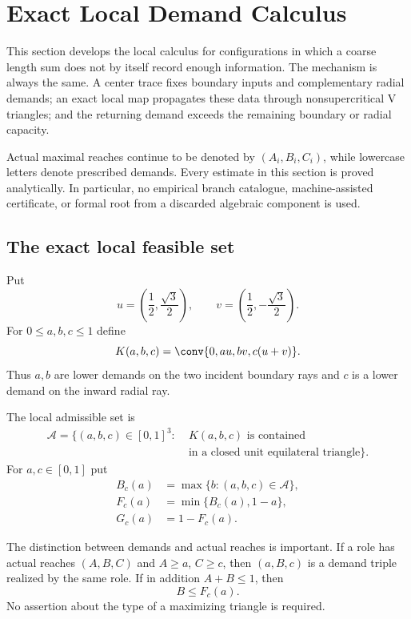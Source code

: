 \section{Exact Local Demand Calculus}
\label{sec:exact-local-demand-calculus}

This section develops the local calculus for configurations in which a coarse
length sum does not by itself record enough information.  The mechanism is
always the same.  A center trace fixes boundary inputs and complementary
radial demands; an exact
local map propagates these data through nonsupercritical V triangles; and the
returning demand exceeds the remaining boundary or radial capacity.

Actual maximal reaches continue to be denoted by $(A_i,B_i,C_i)$, while
lowercase letters denote prescribed demands.  Every estimate in this section
is proved analytically.  In particular, no empirical branch catalogue,
machine-assisted certificate, or formal root from a discarded algebraic
component is used.

\subsection{The exact local feasible set}

Put
\[
 u=\left(\frac12,\frac{\sqrt3}{2}\right),\qquad
 v=\left(\frac12,-\frac{\sqrt3}{2}\right).
\]
For $0\le a,b,c\le1$ define
\[
 K(a,b,c)=\conv\{0,au,bv,c(u+v)\}.
\]
Thus $a,b$ are lower demands on the two incident boundary rays and $c$ is a
lower demand on the inward radial ray.

\begin{definition}
\label{def:admissible-demands}
The local admissible set is
\[
 \begin{aligned}
 \mathcal A=\{(a,b,c)\in[0,1]^3:\;&K(a,b,c)\text{ is contained}\\
 &\text{in a closed unit equilateral triangle}\}.
 \end{aligned}
\]
For $a,c\in[0,1]$ put
\[
 \begin{aligned}
 B_c(a)&=\max\{b:(a,b,c)\in\mathcal A\},\\
 F_c(a)&=\min\{B_c(a),1-a\},\\
 G_c(a)&=1-F_c(a).
 \end{aligned}
\]
\end{definition}

The distinction between demands and actual reaches is important.  If a role
has actual reaches $(A,B,C)$ and $A\ge a$, $C\ge c$, then $(a,B,c)$ is a
demand triple realized by the same role.  If in addition $A+B\le1$, then
\begin{equation}
 B\le F_c(a).
 \label{eq:safe-capped-bound}
\end{equation}
No assertion about the type of a maximizing triangle is required.

